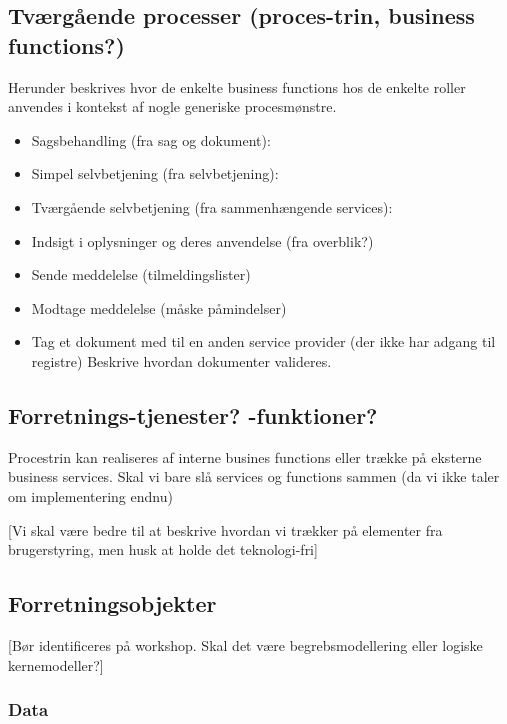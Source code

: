 \subsection{Tværgående processer (proces-trin, business
functions?)}\label{tvuxe6rguxe5ende-processer-proces-trin-business-functions}

Herunder beskrives hvor de enkelte business functions hos de enkelte
roller anvendes i kontekst af nogle generiske procesmønstre.

\begin{itemize}
\tightlist
\item
  Sagsbehandling (fra sag og dokument):
\item
  Simpel selvbetjening (fra selvbetjening):
\item
  Tværgående selvbetjening (fra sammenhængende services):
\item
  Indsigt i oplysninger og deres anvendelse (fra overblik?)
\item
  Sende meddelelse (tilmeldingslister)
\item
  Modtage meddelelse (måske påmindelser)
\item
  Tag et dokument med til en anden service provider (der ikke har adgang
  til registre) Beskrive hvordan dokumenter valideres.
\end{itemize}

\subsection{Forretnings-tjenester?
-funktioner?}\label{forretnings-tjenester--funktioner}

Procestrin kan realiseres af interne busines functions eller trække på
eksterne business services. Skal vi bare slå services og functions
sammen (da vi ikke taler om implementering endnu)

{[}Vi skal være bedre til at beskrive hvordan vi trækker på elementer
fra brugerstyring, men husk at holde det teknologi-fri{]}

\subsection{Forretningsobjekter}\label{forretningsobjekter}

{[}Bør identificeres på workshop. Skal det være begrebsmodellering eller
logiske kernemodeller?{]}

\subsubsection{Data}\label{data}

